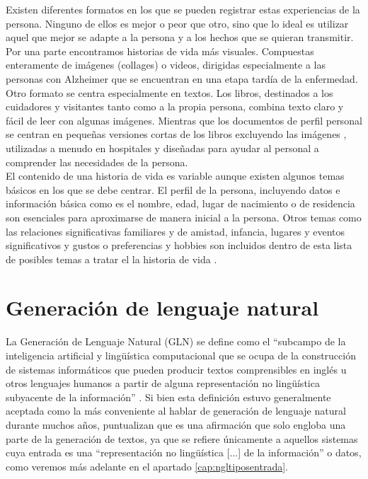 Existen diferentes formatos en los que se pueden registrar estas experiencias de la persona. Ninguno de ellos es mejor o peor que otro, sino que lo ideal es utilizar aquel que mejor se adapte a la persona y a los hechos que se quieran transmitir.\\

Por una parte encontramos historias de vida más visuales. Compuestas enteramente de imágenes (collages) o videos, dirigidas especialmente a las personas con Alzheimer que se encuentran en una etapa tardía de la enfermedad. Otro formato se centra especialmente en textos. Los libros, destinados a los cuidadores y visitantes tanto como a la propia persona, combina texto claro y fácil de leer con algunas imágenes. Mientras que los documentos de perfil personal se centran en pequeñas versiones cortas de los libros excluyendo las imágenes , utilizadas a menudo en hospitales y diseñadas para ayudar al personal a comprender las necesidades de la persona.\\

El contenido de una historia de vida es variable aunque existen algunos temas básicos en los que se debe centrar. El perfil de la persona, incluyendo datos e información básica como es el nombre, edad, lugar de nacimiento o de residencia son esenciales para aproximarse de manera inicial a la persona. Otros temas como las relaciones significativas familiares y de amistad, infancia, lugares y eventos significativos y gustos o preferencias y hobbies son incluidos dentro de esta lista de posibles temas a tratar el la historia de vida \citep{dementiauk}.\\

\section{Generación de lenguaje natural}

La Generación de Lenguaje Natural (GLN) se define como el ``subcampo de la inteligencia artificial y lingüística computacional que se ocupa de la construcción de sistemas informáticos que pueden producir textos comprensibles en inglés u otros lenguajes humanos a partir de alguna representación no lingüística subyacente de la información''  \citep{reiter1997building}. Si bien esta definición estuvo generalmente aceptada como la más conveniente al hablar de generación de lenguaje natural durante muchos años, \cite{gatt2018survey} puntualizan que es una afirmación que solo engloba una parte de la generación de textos, ya que se refiere únicamente a aquellos sistemas cuya entrada es una ``representación no lingüística [...] de la información'' o datos, como veremos más adelante en el apartado \ref{cap:ngltiposentrada}.\\

